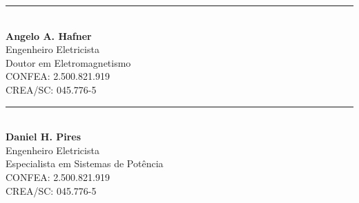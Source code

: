 \documentclass[a4paper]{article}
\begin{document}
\printbibliography







\noindent %
\begin{minipage}[t]{0.5\textwidth}
	\centering
	\vspace{4cm}
	\rule{6cm}{0.4pt}\\
	{\linespread{0.9}\selectfont %
		\textbf{Angelo A. Hafner}\\
		Engenheiro Eletricista\\ Doutor em Eletromagnetismo\\
		CONFEA: 2.500.821.919\\
		CREA/SC: 045.776-5\\
	}
\end{minipage}
\hfill %
\begin{minipage}[t]{0.5\textwidth}
	\centering
	\vspace{4cm}
	\rule{6cm}{0.4pt}\\
	{\linespread{0.9}\selectfont %
		\textbf{Daniel H. Pires}\\
		Engenheiro Eletricista\\ Especialista em Sistemas de Potência\\
		CONFEA: 2.500.821.919\\
		CREA/SC: 045.776-5\\
	}
\end{minipage}
\end{document}
